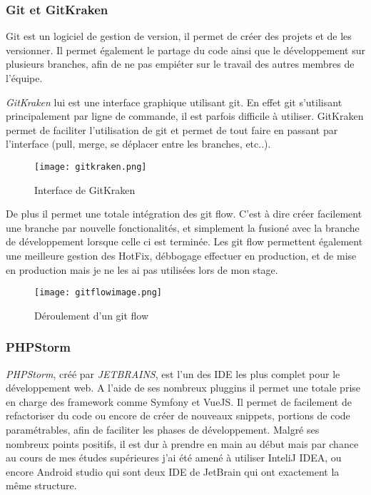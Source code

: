\subsubsection{Git et GitKraken}
Git est un logiciel de gestion de version, il permet de créer des projets et de les versionner. Il permet également le partage du code ainsi que le développement sur plusieurs branches, afin de ne pas empiéter sur le travail des autres membres de l'équipe.

\textit{GitKraken}\cite{gitkraken} lui est une interface graphique utilisant git. En effet git s'utilisant principalement par ligne de commande, il est parfois difficile à utiliser. GitKraken permet de faciliter l'utilisation de git et permet de tout faire en passant par l'interface (pull, merge, se déplacer entre les branches, etc..).

\begin{figure}[htbp]
    \center
    \texttt{[image: gitkraken.png]}
    \caption{Interface de  GitKraken}
\end{figure}

De plus il permet une totale intégration des git flow. C'est à dire créer facilement une branche par nouvelle fonctionalités, et simplement la fusioné avec la branche de développement lorsque celle ci est terminée.
Les git flow permettent également une meilleure gestion des HotFix, débbogage effectuer en production, et de mise en production mais je ne les ai pas utilisées lors de mon stage. 

\begin{figure}[htbp]
    \center
\texttt{[image: gitflowimage.png]}
\caption{Déroulement d'un git flow}
\end{figure}


\subsubsection{PHPStorm}

\textit{PHPStorm}\cite{phpstorm}, créé par \textit{JETBRAINS}\cite{jetbrains}, est l'un des IDE les plus complet pour le développement web.
A l'aide de ses nombreux pluggins il permet une totale prise en charge des framework comme Symfony\cite{symfony} et VueJS\cite{vue}. Il permet de facilement de refactoriser du code  ou encore de créer de nouveaux snippets, portions de code paramétrables, afin de faciliter les phases de développement.
Malgré ses nombreux points positifs, il est dur à prendre en main au début mais par chance au cours de mes études supérieures j'ai été amené à utiliser InteliJ IDEA\cite{idea}, ou encore Android studio\cite{androidstudio} qui sont deux IDE de JetBrain qui ont exactement la même structure. 

